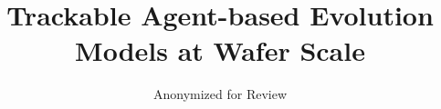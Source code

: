 \title{ Trackable Agent-based Evolution Models at Wafer Scale}

\author[1]{Anonymized for Review}



\maketitle
